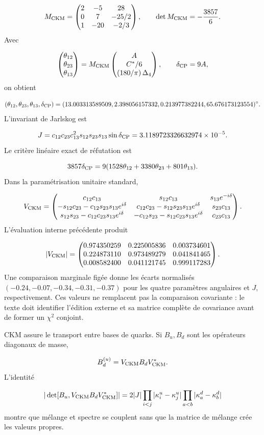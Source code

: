 \[
M_{\rm CKM}=
\begin{pmatrix}
2&-5&28\\
0&7&-25/2\\
1&-20&-2/3
\end{pmatrix},
\qquad
\det M_{\rm CKM}=-\frac{3857}{6}.
\]
Avec

\[
\begin{pmatrix}\theta_{12}\\\theta_{23}\\\theta_{13}\end{pmatrix}
=M_{\rm CKM}
\begin{pmatrix}A\\C^*/6\\{\left(180/\pi\right)\Delta_4}\end{pmatrix},
\qquad
\delta_{\rm CP}=9A,
\]
on obtient

\[
(\theta_{12},\theta_{23},\theta_{13},\delta_{\rm CP})
=
(13.003313589509,
2.398056157332,
0.213977382244,
65.676173123554)^\circ.
\]
L'invariant de Jarlskog est

\[
J=c_{12}c_{23}c_{13}^2s_{12}s_{23}s_{13}\sin\delta_{\rm CP}
=3.1189723326632974\times10^{-5}.
\]
Le critère linéaire exact de réfutation est

\[
3857\delta_{\rm CP}
=9(1528\theta_{12}+3380\theta_{23}+801\theta_{13}).
\]
Dans la paramétrisation unitaire standard,

\[
V_{\rm CKM}=
\begin{pmatrix}
c_{12}c_{13}&s_{12}c_{13}&s_{13}e^{-i\delta}\cr
-s_{12}c_{23}-c_{12}s_{23}s_{13}e^{i\delta}&
c_{12}c_{23}-s_{12}s_{23}s_{13}e^{i\delta}&s_{23}c_{13}\cr
s_{12}s_{23}-c_{12}c_{23}s_{13}e^{i\delta}&
-c_{12}s_{23}-s_{12}c_{23}s_{13}e^{i\delta}&c_{23}c_{13}
\end{pmatrix}.
\]
L'évaluation interne précédente produit

\[
|V_{\rm CKM}|=
\begin{pmatrix}
0.974350259&0.225005836&0.003734601\cr
0.224873110&0.973489279&0.041841465\cr
0.008582400&0.041121745&0.999117283
\end{pmatrix}.
\]
Une comparaison marginale figée donne les écarts normalisés \((-0.24,-0.07,-0.34,-0.31,-0.37)\) pour les quatre paramètres angulaires et \(J\), respectivement. Ces valeurs ne remplacent pas la comparaison covariante : le texte doit identifier l'édition externe et sa matrice complète de covariance avant de former un \(\chi^2\) conjoint.

CKM assure le transport entre bases de quarks. Si \(B_u,B_d\) sont les opérateurs diagonaux de masse,

\[
B_d^{(u)}=V_{\rm CKM}B_dV_{\rm CKM}^*.
\]
L’identité

\[
|\det[B_u,V_{\rm CKM}B_dV_{\rm CKM}^*]|
=2|J|
\prod_{i<j}|\kappa_i^u-\kappa_j^u|
\prod_{a<b}|\kappa_a^d-\kappa_b^d|
\]
montre que mélange et spectre se couplent sans que la matrice de mélange crée les valeurs propres.


